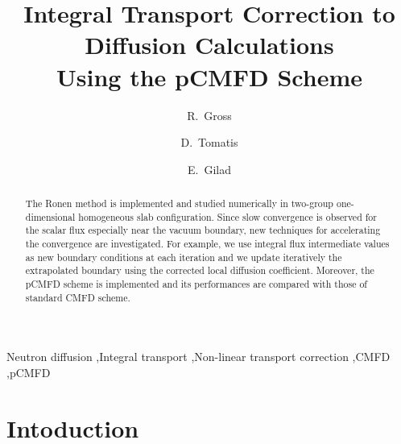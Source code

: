 \documentclass[review,3p,onecolumn,sort&compress]{elsarticle}
\begin{document}
	
	\begin{frontmatter}
		
		\linenumbers
		
		\title{Integral Transport Correction to Diffusion Calculations \\ Using the pCMFD Scheme}
		
		\author[bgu]{R.~Gross}
		\author[cea]{D.~Tomatis}
		\author[bgu]{E.~Gilad}
		
		
		\address[bgu]{The Unit of Nuclear Engineering, Ben-Gurion University of the Negev, Beer-Sheva 8410501, Israel}
		\address[cea]{CEA, DEN, Service d’\'etudes des r\'eacteurs et de math\'ematiques appliqu\'ees (SERMA), 	
						Universit\'e Paris-Saclay, F-91191, Gif-sur-Yvette, France}
		
		\begin{abstract}
		\modulolinenumbers[1]
		\linenumbers
		The Ronen method is implemented and studied numerically in two-group one-dimensional homogeneous slab configuration. Since slow convergence is observed for the scalar flux especially near the vacuum boundary, new techniques for accelerating the convergence are investigated. For example, we use integral flux intermediate values as new boundary conditions at each iteration and we update iteratively the extrapolated boundary using the corrected local diffusion coefficient. Moreover, the pCMFD scheme is implemented and its performances are compared with those of standard CMFD scheme.
		\end{abstract}
		\begin{keyword}
		Neutron diffusion \sep Integral transport \sep Non-linear transport correction \sep CMFD \sep pCMFD
		\end{keyword}
	\end{frontmatter}
	
	
\linenumbers

\newpage

\section{Intoduction}
\label{sec:intro}
\end{document}
